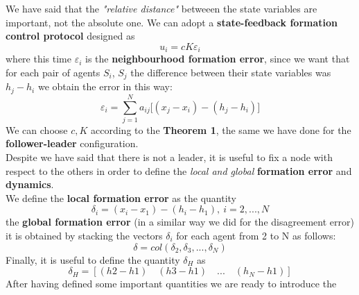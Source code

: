 We have said that the \textit{"relative distance"} betweeen the state variables are important, not the absolute one. We can adopt a \textbf{state-feedback formation control protocol} designed as
\begin{equation*}
    u_i = cK\varepsilon_i
\end{equation*}
where this time $\varepsilon_i$ is the \textbf{neighbourhood formation error}, since we want that for each pair of agents $S_i$, $S_j$ the difference between their state variables was $h_j-h_i$ we obtain the error in this way:
\begin{equation}
    \varepsilon_i = \sum_{j=1}^N a_{ij} \big[
        (x_j-x_i) - (h_j-h_i)
    \big]
\end{equation}
We can choose $c, K$ according to the \textbf{Theorem 1}, the same we have done for the \textbf{follower-leader} configuration.\\
Despite we have said that there is not a leader, it is useful to fix a node with respect to the others in order to define the  \textit{local and global} \textbf{formation error} and \textbf{dynamics}. \\
We define the \textbf{local formation error} as the quantity
\begin{equation*}
    \delta_i = (x_i-x_1) - (h_i-h_1), \ i=2,...,N
\end{equation*}
the \textbf{global formation error} (in a similar way we did for the disagreement error) it is obtained by stacking the vectors $\delta_i$ for each agent from 2 to N  as follows: 
\begin{equation*}
    \delta = col(\delta_2, \delta_3, ..., \delta_N)
\end{equation*}
Finally, it is useful to define the quantity $\delta_H$ as
\begin{equation*}
    \delta_H = [(h2-h1)\quad (h3-h1)\quad ...\quad (h_N-h1)]
\end{equation*}
\noindent
After having defined some important quantities we are ready to introduce the\\

